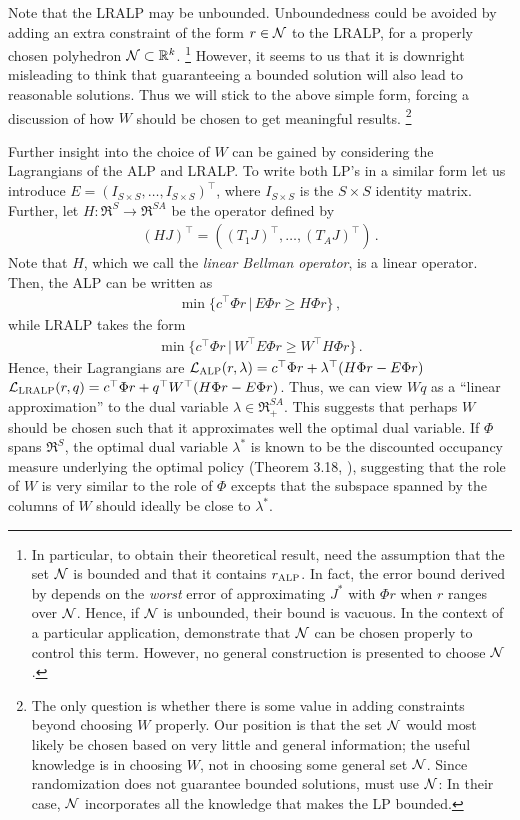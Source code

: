 \documentclass[12pt,draftcls,onecolumn]{IEEEtran}
\begin{document}
Note that the LRALP may be unbounded.
Unboundedness could be avoided by adding an extra constraint of the form $r\in \mathcal{N}$ to the LRALP,
for a properly chosen polyhedron $\mathcal{N} \subset \mathbb{R}^k$.%
\footnote{
In particular, to obtain their theoretical result, \citet{CS} need the assumption that the set $\mathcal{N}$
is bounded and that it contains $r_{\text{\sc ALP}}$. In fact,
the error bound derived by \citeauthor{CS} depends on the \emph{worst}
error of approximating $J^*$ with $\Phi r$ when
$r$ ranges over $\mathcal{N}$. Hence, if $\mathcal{N}$ is unbounded, their bound is vacuous. In the context of a particular application,
\citet{CS} demonstrate that $\mathcal{N}$ can be chosen properly to control this term.
However, no general construction is presented to choose $\mathcal{N}$.}
However, it seems to us that it is downright misleading to think that guaranteeing a bounded solution
will also lead to reasonable solutions.
Thus we will stick to the above simple form, forcing a discussion of how $W$ should be chosen to get meaningful results.%
\footnote{
The only question is whether there is some value in adding constraints beyond choosing $W$ properly.
Our position is that the set $\mathcal{N}$ would most likely be chosen based on very little and general information;
the useful knowledge is in choosing $W$, not in choosing some general set $\mathcal{N}$.
Since randomization does not guarantee bounded solutions, \citet{ALP} must use $\mathcal{N}$:
In their case, $\mathcal{N}$ incorporates
all the knowledge that makes the LP bounded.
}

Further insight into the choice of $W$ can be gained by
considering the Lagrangians of the ALP and LRALP. To write both LP's in a similar form let us introduce $E = (I_{S\times S},\dots,I_{S\times S})^\top$, where $I_{S\times S}$ is the $S\times S$ identity matrix. Further, let $H:\Re^S \to \Re^{SA}$ be the operator defined by 
\begin{align*}
(HJ)^\top = ( (T_1 J)^\top, \dots, (T_A J)^\top )\,.
\end{align*}
Note that $H$, which we call the \emph{linear Bellman operator}, is a linear operator.
Then, the ALP can be written as 
\begin{align*}
\min\{ c^\top \Phi r \,|\, E \Phi r \ge H \Phi r \}\,, \tag{ALP}
\end{align*}
while LRALP takes the form
\begin{align*}
\min\{ c^\top \Phi r \,|\, W^\top E \Phi r \ge W^\top H \Phi r \}\,. \tag{LRALP}
\end{align*}
Hence, their Lagrangians are $\mathcal{L}_{\text{\sc ALP}}(r,\lambda) = c^\top \Phi r+\lambda^\top (H\Phi r-E\Phi r)$
$\mathcal{L}_{\text{\sc LRALP}}(r,q) = c^\top \Phi r+q^\top W^\top (H\Phi r-E\Phi r)$. Thus, we can view $W q$ as a ``linear approximation''
to the dual variable $\lambda \in \Re_+^{SA}$.
This suggests that perhaps $W$ should be chosen such that it approximates well the optimal dual variable.
If $\Phi$ spans $\Re^{S}$, the optimal dual variable $\lambda^*$ is known to be the discounted occupancy measure underlying the optimal policy (Theorem 3.18, \cite{Kall17}), suggesting that the role of $W$ is very similar to the role of $\Phi$ excepts that the subspace spanned by the columns of $W$ should ideally be close to $\lambda^*$.
\end{document}

